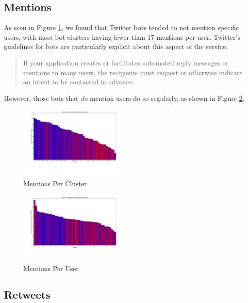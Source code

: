 \documentclass{sig-alternate-05-2015}
\begin{document}
\subsection{Mentions}
As seen in Figure \ref{fig:ment1}, we found that Twitter bots tended to not mention specific users, with most bot clusters having fewer than 17 mentions per user. Twitter's guidelines for bots are particularly explicit about this aspect of the service:

\begin{quote}If your application creates or facilitates automated reply messages or mentions to many users, the recipients must request or otherwise indicate an intent to be contacted in advance.\cite{twitter:automation}\end{quote}

However, those bots that \emph{do} mention users do so regularly, as shown in Figure \ref{fig:ment2}.

\begin{figure}[h!]
	\caption{Mentions Per Cluster}
	\label{fig:ment1}
	\centering
		\includegraphics[width=0.5\textwidth]{imgs/mentionspercluster}
\end{figure}

\begin{figure}[h!]
	\caption{Mentions Per User}
	\label{fig:ment2}
	\centering
		\includegraphics[width=0.5\textwidth]{imgs/mentionsperuserpercluster}
\end{figure}

\subsection{Retweets}
\end{document}

